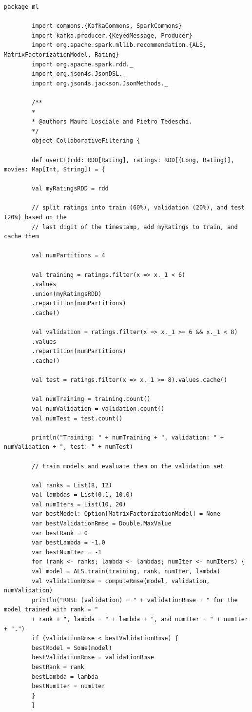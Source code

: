 \documentclass[11pt]{article}
\begin{document}
\begin{appendices}
\begin{lstlisting}[style=scalacode, caption=KafkaCommons.scala]
	\end{lstlisting}
	\begin{lstlisting}[style=scalacode, caption=CollaborativeFiltering.scala]
		package ml
		
		import commons.{KafkaCommons, SparkCommons}
		import kafka.producer.{KeyedMessage, Producer}
		import org.apache.spark.mllib.recommendation.{ALS, MatrixFactorizationModel, Rating}
		import org.apache.spark.rdd._
		import org.json4s.JsonDSL._
		import org.json4s.jackson.JsonMethods._
		
		/**
		*
		* @authors Mauro Losciale and Pietro Tedeschi.
		*/
		object CollaborativeFiltering {
		
		def userCF(rdd: RDD[Rating], ratings: RDD[(Long, Rating)], movies: Map[Int, String]) = {
		
		val myRatingsRDD = rdd
		
		// split ratings into train (60%), validation (20%), and test (20%) based on the
		// last digit of the timestamp, add myRatings to train, and cache them
		
		val numPartitions = 4
		
		val training = ratings.filter(x => x._1 < 6)
		.values
		.union(myRatingsRDD)
		.repartition(numPartitions)
		.cache()
		
		val validation = ratings.filter(x => x._1 >= 6 && x._1 < 8)
		.values
		.repartition(numPartitions)
		.cache()
		
		val test = ratings.filter(x => x._1 >= 8).values.cache()
		
		val numTraining = training.count()
		val numValidation = validation.count()
		val numTest = test.count()
		
		println("Training: " + numTraining + ", validation: " + numValidation + ", test: " + numTest)
		
		// train models and evaluate them on the validation set
		
		val ranks = List(8, 12)
		val lambdas = List(0.1, 10.0)
		val numIters = List(10, 20)
		var bestModel: Option[MatrixFactorizationModel] = None
		var bestValidationRmse = Double.MaxValue
		var bestRank = 0
		var bestLambda = -1.0
		var bestNumIter = -1
		for (rank <- ranks; lambda <- lambdas; numIter <- numIters) {
		val model = ALS.train(training, rank, numIter, lambda)
		val validationRmse = computeRmse(model, validation, numValidation)
		println("RMSE (validation) = " + validationRmse + " for the model trained with rank = "
		+ rank + ", lambda = " + lambda + ", and numIter = " + numIter + ".")
		if (validationRmse < bestValidationRmse) {
		bestModel = Some(model)
		bestValidationRmse = validationRmse
		bestRank = rank
		bestLambda = lambda
		bestNumIter = numIter
		}
		}
		

\end{lstlisting}
\end{appendices}
\end{document}
